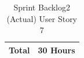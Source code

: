 \documentclass[12pt]{report}
\begin{document}
\begin{table}[h]
{\begin{tabular}{|cc|cccccccc|}
\multicolumn{2}{|c|}{\textbf{Total}}                                                                                                                                                  & \multicolumn{8}{c|}{30   Hours}                                                                                                                                                                                                                                                                                                                                                                                                                                                                                                                                                                                                                                                                                                                                                                                                                                                                                            \\ \hline
\end{tabular}
}
\caption{Sprint Backlog2 (Actual) User Story 7}
\label{tab:mytable}
\end{table}
\end{document}
